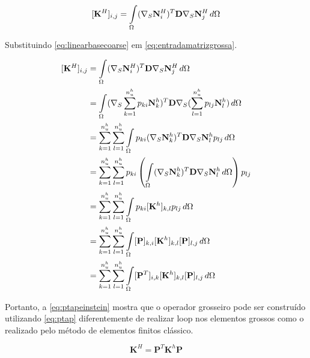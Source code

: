 \begin{equation} \label{eq:entradamatrizgrossa}
    \rigidmatrixcoarseentry = \omeint{(\sopnabla \basefunctioncoarse[i])^T \mathbf{D} \sopnabla \basefunctioncoarse[j]}
\end{equation}

Substituindo \eqref{eq:linearbasecoarse} em \eqref{eq:entradamatrizgrossa}.


\begin{align}
     \rigidmatrixcoarseentry  & =   \omeint{(\sopnabla \basefunctioncoarse[i])^T \mathbf{D} \sopnabla \basefunctioncoarse[j]} \nonumber \\
                & =   \omeint{(\sopnabla  \sum_{k=1}^{\qtdfreedomfine} p_{ki} \basefunctionfine[k])^T \mathbf{D} \sopnabla( \sum_{l=1}^{\qtdfreedomfine} p_{lj} \basefunctionfine[l] )}  \nonumber \\
                & =    \sum_{k=1}^{\qtdfreedomfine}  \sum_{l=1}^{\qtdfreedomfine} \omeint{p_{ki} ( \sopnabla \basefunctionfine[k])^T \mathbf{D} \sopnabla \basefunctionfine[l] p_{lj}  }                  \nonumber \\
                & =    \sum_{k=1}^{\qtdfreedomfine}  \sum_{l=1}^{\qtdfreedomfine} p_{ki} \left( \omeint{ ( \sopnabla \basefunctionfine[k])^T \mathbf{D} \sopnabla \basefunctionfine[l]   } \right)p_{lj}                            \nonumber \\
                & = \sum_{k=1}^{\qtdfreedomfine}  \sum_{l=1}^{\qtdfreedomfine} \omeint{     p_{ki} [\rigidmatrix]_{k,l} p_{lj}}  \nonumber \\
                & = \sum_{k=1}^{\qtdfreedomfine}  \sum_{l=1}^{\qtdfreedomfine} \omeint{   [\mathbf{P}]_{k,i} [\rigidmatrix]_{k,l} [\mathbf{P}]_{l,j}}                                         \nonumber \\
                & = \sum_{k=1}^{\qtdfreedomfine}  \sum_{l=1}^{\qtdfreedomfine} \omeint{   [\mathbf{P}^T]_{i,k} [\rigidmatrix]_{k,l} [\mathbf{P}]_{l,j}     }   \label{eq:ptapeinstein}  
\end{align}


Portanto, a \eqref{eq:ptapeinstein} mostra que o operador grosseiro pode ser construído utilizando \eqref{eq:ptap} diferentemente de realizar loop nos elementos grossos  como o realizado pelo método de elementos finitos clássico.

\begin{equation} \label{eq:ptap}
    \mathbf{K}^H = \mathbf{P}^T  \mathbf{K}^h \mathbf{P}
\end{equation}

